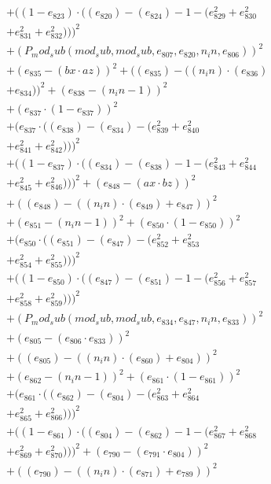 \documentclass[10pt, a4paper]{article}
\begin{document}
\begin{small}
\begin{align*}
& + ((1 - e_{823})  \cdot  ((e_{820}) - (e_{824}) - 1 - (e_{829}^{2} + e_{830}^{2} \\
& + e_{831}^{2} + e_{832}^{2})))^{2} \\
& + (P_mod_sub(mod_sub, mod_sub, e_{807}, e_{820}, n_in, e_{806}))^{2} \\
& + (e_{835} - (bx  \cdot  az))^{2} + ((e_{835}) - ((n_in)  \cdot  (e_{836}) \\
& + e_{834}))^{2} + (e_{838} - (n_in - 1))^{2} \\
& + (e_{837}  \cdot  (1 - e_{837}))^{2} \\
& + (e_{837}  \cdot  ((e_{838}) - (e_{834}) - (e_{839}^{2} + e_{840}^{2} \\
& + e_{841}^{2} + e_{842}^{2})))^{2} \\
& + ((1 - e_{837})  \cdot  ((e_{834}) - (e_{838}) - 1 - (e_{843}^{2} + e_{844}^{2} \\
& + e_{845}^{2} + e_{846}^{2})))^{2} + (e_{848} - (ax  \cdot  bz))^{2} \\
& + ((e_{848}) - ((n_in)  \cdot  (e_{849}) + e_{847}))^{2} \\
& + (e_{851} - (n_in - 1))^{2} + (e_{850}  \cdot  (1 - e_{850}))^{2} \\
& + (e_{850}  \cdot  ((e_{851}) - (e_{847}) - (e_{852}^{2} + e_{853}^{2} \\
& + e_{854}^{2} + e_{855}^{2})))^{2} \\
& + ((1 - e_{850})  \cdot  ((e_{847}) - (e_{851}) - 1 - (e_{856}^{2} + e_{857}^{2} \\
& + e_{858}^{2} + e_{859}^{2})))^{2} \\
& + (P_mod_sub(mod_sub, mod_sub, e_{834}, e_{847}, n_in, e_{833}))^{2} \\
& + (e_{805} - (e_{806}  \cdot  e_{833}))^{2} \\
& + ((e_{805}) - ((n_in)  \cdot  (e_{860}) + e_{804}))^{2} \\
& + (e_{862} - (n_in - 1))^{2} + (e_{861}  \cdot  (1 - e_{861}))^{2} \\
& + (e_{861}  \cdot  ((e_{862}) - (e_{804}) - (e_{863}^{2} + e_{864}^{2} \\
& + e_{865}^{2} + e_{866}^{2})))^{2} \\
& + ((1 - e_{861})  \cdot  ((e_{804}) - (e_{862}) - 1 - (e_{867}^{2} + e_{868}^{2} \\
& + e_{869}^{2} + e_{870}^{2})))^{2} + (e_{790} - (e_{791}  \cdot  e_{804}))^{2} \\
& + ((e_{790}) - ((n_in)  \cdot  (e_{871}) + e_{789}))^{2} \\

\end{align*}
\end{small}
\end{document}
